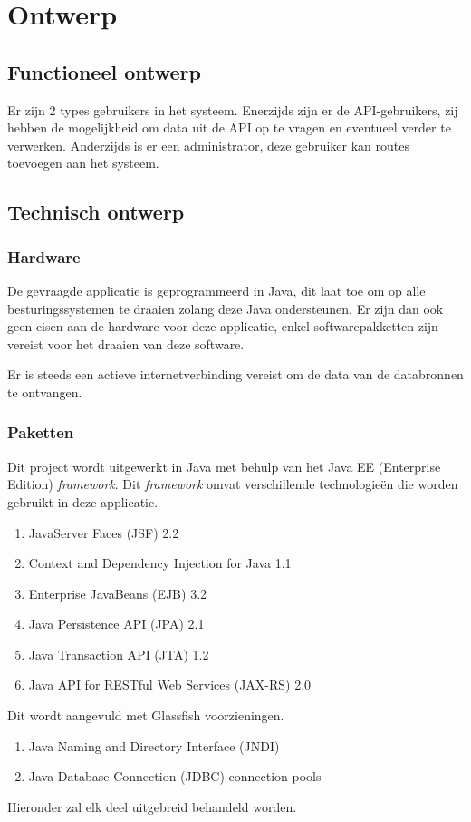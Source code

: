 \documentclass[ps,a4paper,oneside]{report}
\begin{document}
\chapter{Ontwerp}
\section{Functioneel ontwerp}
Er zijn 2 types gebruikers in het systeem. Enerzijds zijn er de API-gebruikers, zij hebben de mogelijkheid om data uit de API op te vragen en eventueel verder te verwerken. Anderzijds is er een administrator, deze gebruiker kan routes toevoegen aan het systeem.
\section{Technisch ontwerp}
\subsection{Hardware}
De gevraagde applicatie is geprogrammeerd in Java, dit laat toe om op alle besturingssystemen te draaien zolang deze Java ondersteunen. Er zijn dan ook geen eisen aan de hardware voor deze applicatie, enkel softwarepakketten zijn vereist voor het draaien van deze software.

Er is steeds een actieve internetverbinding vereist om de data van de databronnen te ontvangen.
\subsection{Paketten}
Dit project wordt uitgewerkt in Java met behulp van het Java EE (Enterprise Edition) \textit{framework}. Dit \textit{framework} omvat verschillende technologie\"en die worden gebruikt in deze applicatie.
\begin{enumerate}	
	\item JavaServer Faces (JSF) 2.2
	\item Context and Dependency Injection for Java 1.1
	\item Enterprise JavaBeans (EJB) 3.2
	\item Java Persistence API (JPA) 2.1
	\item Java Transaction API (JTA) 1.2
	\item Java API for RESTful Web Services (JAX-RS) 2.0
\end{enumerate}
Dit wordt aangevuld met Glassfish voorzieningen.
\begin{enumerate}
	\item Java Naming and Directory Interface (JNDI)
	\item Java Database Connection (JDBC) connection pools
\end{enumerate}
Hieronder zal elk deel uitgebreid behandeld worden.
\end{document}
